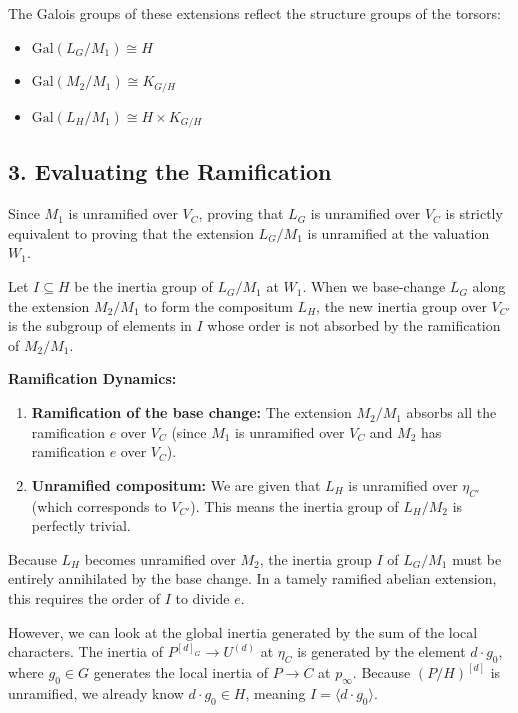 The Galois groups of these extensions reflect the structure groups of the torsors:
\begin{itemize}
    \item $\text{Gal}(L_G / M_1) \cong H$
    \item $\text{Gal}(M_2 / M_1) \cong K_{G/H}$
    \item $\text{Gal}(L_H / M_1) \cong H \times K_{G/H}$
\end{itemize}

\subsection*{3. Evaluating the Ramification}

Since $M_1$ is unramified over $V_C$, proving that $L_G$ is unramified over $V_C$ is strictly equivalent to proving that the extension $L_G / M_1$ is unramified at the valuation $W_1$.

Let $I \subseteq H$ be the inertia group of $L_G / M_1$ at $W_1$. When we base-change $L_G$ along the extension $M_2 / M_1$ to form the compositum $L_H$, the new inertia group over $V_{C'}$ is the subgroup of elements in $I$ whose order is not absorbed by the ramification of $M_2 / M_1$.

\textbf{Ramification Dynamics:}
\begin{enumerate}
    \item \textbf{Ramification of the base change:} The extension $M_2 / M_1$ absorbs all the ramification $e$ over $V_C$ (since $M_1$ is unramified over $V_C$ and $M_2$ has ramification $e$ over $V_C$).
    \item \textbf{Unramified compositum:} We are given that $L_H$ is unramified over $\eta_{C'}$ (which corresponds to $V_{C'}$). This means the inertia group of $L_H / M_2$ is perfectly trivial.
\end{enumerate}

Because $L_H$ becomes unramified over $M_2$, the inertia group $I$ of $L_G / M_1$ must be entirely annihilated by the base change. In a tamely ramified abelian extension, this requires the order of $I$ to divide $e$.

However, we can look at the global inertia generated by the sum of the local characters. The inertia of $P^{[d]_G} \to U^{(d)}$ at $\eta_C$ is generated by the element $d \cdot g_0$, where $g_0 \in G$ generates the local inertia of $P \to C$ at $p_\infty$. Because $(P/H)^{[d]}$ is unramified, we already know $d \cdot g_0 \in H$, meaning $I = \langle d \cdot g_0 \rangle$.

